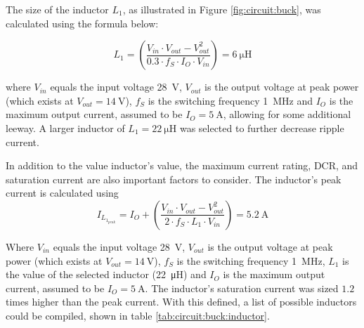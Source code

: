 The size of the inductor $L_1$, as illustrated in Figure \ref{fig:circuit:buck},
was calculated using the formula below:

\begin{equation}
    L_1 = \left( \frac{V_{in} \cdot V_{out} - V_{out}^2}{0.3 \cdot f_S \cdot I_O \cdot V_{in}} \right) = \SI{6}{\micro\henry}
    \label{eq:circuit:buck:inductor}
\end{equation}

where  $V_{in}$ equals  the  input voltage  \SI{28}{\volt},  $V_{out}$ is  the
output voltage  at peak  power (which exists  at $V_{out}  = \SI{14}{\volt}$),
$f_S$ is the switching frequency  \SI{1}{\mega\hertz} and $I_O$ is the maximum
output  current, assumed  to be  $I_O  = \SI{5}{\ampere}$,  allowing for  some
additional leeway.   A larger  inductor of  $L_1 =  \SI{22}{\micro\henry}$ was
selected to further decrease ripple current.

In addition to the value inductor's value, the maximum current rating, DCR, and
saturation  current are also important factors to consider. The inductor's peak
current is calculated using
\begin{equation}
    I_{L_{1_{peak}}} = I_O + \left( \frac{V_{in} \cdot V_{out} - V_{out}^2}{2 \cdot f_S \cdot L_1 \cdot V_{in}} \right) = \SI{5.2}{\ampere}
    \label{eq:circuit:buck:inductor_peak}
\end{equation}

Where  $V_{in}$ equals  the  input voltage  \SI{28}{\volt},  $V_{out}$ is  the
output voltage  at peak  power (which exists  at $V_{out}  = \SI{14}{\volt}$),
$f_S$ is  the switching frequency  \SI{1}{\mega\hertz}, $L_1$ is the  value of
the selected inductor (\SI{22}{\micro\henry}) and  $I_O$ is the maximum output
current, assumed  to be  $I_O =  \SI{5}{\ampere}$.  The  inductor's saturation
current  was  sized  $1.2$  times  higher than  the  peak  current. With  this
defined,  a list  of  possible inductors  could be  compiled,  shown in  table
\ref{tab:circuit:buck:inductor}.



